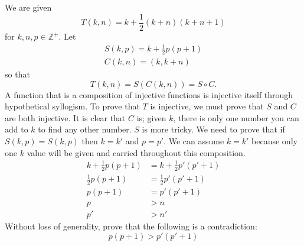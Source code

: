 \documentclass{article}
\begin{document}
\subsection{}
We are given
\begin{equation*}
    T(k,n) = k + \frac{1}{2}(k+n)(k+n+1)
\end{equation*}
for $k,n,p \in \mathbb{Z}^+$. Let
\begin{gather*}
    S(k,p) = k+\frac{1}{2}p(p+1)\\
    C(k,n) = (k,k+n)
\end{gather*}
so that
\begin{equation*}
    T(k,n) = S(C(k,n)) = S \circ C.
\end{equation*} 
A function that is a composition of injective functions is injective itself through hypothetical syllogism. To prove that $T$ is injective, we must prove that $S$ and $C$ are both injective. It is clear that $C$ is; given $k$, there is only one number you can add to $k$ to find any other number.
$S$ is more tricky. We need to prove that if $S(k,p) = S(k,p)$ then $k=k'$ and $p=p'$. We can assume $k = k'$ because only one $k$ value will be given and carried throughout this composition.
\begin{align*}
    k+\frac{1}{2}p(p+1) &= k+\frac{1}{2}p'(p'+1)\\
    \frac{1}{2}p(p+1) &= \frac{1}{2}p'(p'+1)\\
    p(p+1) &= p'(p'+1)\\
    p&>n\\
    p'&>n'
\end{align*}
Without loss of generality, prove that the following is a contradiction:
\begin{equation*}
    p(p+1) > p'(p'+1)
\end{equation*}
\end{document}
